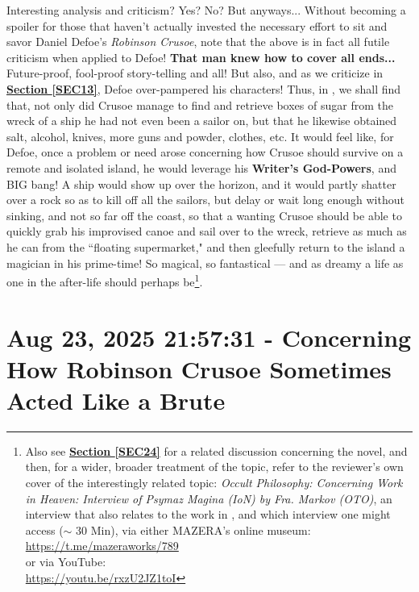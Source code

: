 \documentclass[a4paper]{article}
\begin{document}
Interesting analysis and criticism? Yes? No? But anyways... Without becoming a spoiler for those that haven't actually invested the necessary effort to sit and savor Daniel Defoe's \textit{Robinson Crusoe}, note that the above is in fact all futile criticism when applied to Defoe! \textbf{That man knew how to cover all ends...} Future-proof, fool-proof story-telling and all! But also, and as we criticize in \textbf{\hyperref[SEC13]{Section \ref{SEC13}}}, Defoe over-pampered his characters! Thus, in \cite{Defoe2007}, we shall find that, not only did Crusoe manage to find and retrieve boxes of sugar from the wreck of a ship he had not even been a sailor on, but that he likewise obtained salt, alcohol, knives, more guns and powder, clothes, etc. It would feel like, for Defoe, once a problem or need arose concerning how Crusoe should survive on a remote and isolated island, he would leverage his \textbf{Writer's God-Powers}, and BIG bang! A ship would show up over the horizon, and it would partly shatter over a rock so as to kill off all the sailors, but delay or wait long enough without sinking, and not so far off the coast, so that a wanting Crusoe should be able to quickly grab his improvised canoe and sail over to the wreck, retrieve as much as he can from the ``floating supermarket," and then gleefully return to the island a magician in his prime-time! So magical, so fantastical --- and as dreamy a life as one in the after-life should perhaps be\footnote{Also see \textbf{\hyperref[SEC24]{Section \ref{SEC24}}} for a related discussion concerning the novel, and then, for a wider, broader treatment of the topic, refer to the reviewer's own cover of the interestingly related topic: \textit{Occult Philosophy: Concerning Work in Heaven: Interview of Psymaz Magina (IoN) by Fra. Markov (OTO)}, an interview that also relates to the work in \cite{shrinesjwl}, and which interview one might access ($\sim$ 30 Min), via either MAZERA's online museum:\\ \url{https://t.me/mazeraworks/789} \\or via YouTube:\\\url{https://youtu.be/rxzU2JZ1toI}}.






\section{Aug 23, 2025 21:57:31 - Concerning How Robinson Crusoe Sometimes Acted Like a Brute}
\label{SEC28}
\end{document}
